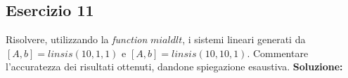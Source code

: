 \subsection{Esercizio 11}
Risolvere, utilizzando la \textit{function} $mialdlt$, i sistemi
lineari generati da $[A,b]=linsis(10, 1, 1)$ e $[A,b]=linsis(10, 10, 1)$. Commentare l'accuratezza dei
risultati ottenuti, dandone spiegazione esaustiva.
\newline \textbf{Soluzione:} \newline